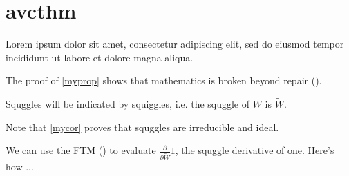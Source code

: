 \newpage
\section*{avcthm}\indent

Lorem ipsum dolor sit amet, consectetur adipiscing elit, sed do eiusmod tempor incididunt ut labore et dolore magna aliqua.
\begin{pro}
\label{myprop}
\end{pro}
The proof of \cref{myprop} shows that mathematics is broken beyond repair ().

\begin{dfn}
\end{dfn}

\begin{ntt}
Squggles will be indicated by squiggles, i.e. the squggle of $W$ is $\widetilde{W}$.
\end{ntt}

\begin{lem}
\end{lem}

\begin{thm}
\label{mythm}
\end{thm}

\begin{cor}
\label{mycor}
\end{cor}

\begin{rmk}
Note that \cref{mycor} proves that squggles are irreducible and ideal.
\end{rmk}

\begin{ex}
We can use the FTM () to evaluate $\displaystyle\frac{\partial}{\partial \widetilde{W}}1$, the squggle derivative of one.  Here's how ...
\end{ex}

